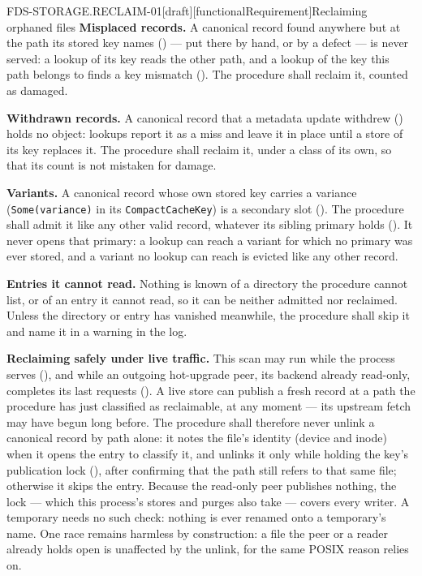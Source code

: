 \begin{requirement}{FDS-STORAGE.RECLAIM-01}[draft][functionalRequirement]{Reclaiming orphaned files}
  \textbf{Misplaced records.} A canonical record found anywhere but at the
  path its stored key names () --- put there by
  hand, or by a defect --- is never served: a lookup of its key reads the
  other path, and a lookup of the key this path belongs to finds a key
  mismatch (). The procedure shall reclaim
  it, counted as damaged.

  \textbf{Withdrawn records.} A canonical record that a metadata update
  withdrew () holds no object: lookups
  report it as a miss and leave it in place until a store of its key
  replaces it. The procedure shall reclaim it, under a class of its own, so
  that its count is not mistaken for damage.

  \textbf{Variants.} A canonical record whose own stored key carries a
  variance (\texttt{Some(variance)} in its \texttt{CompactCacheKey}) is a
  secondary slot (). The procedure shall
  admit it like any other valid record, whatever its sibling primary holds
  (). It never opens that primary: a lookup
  can reach a variant for which no primary was ever stored, and a variant no
  lookup can reach is evicted like any other record.

  \textbf{Entries it cannot read.} Nothing is known of a directory the
  procedure cannot list, or of an entry it cannot read, so it can be neither
  admitted nor reclaimed. Unless the directory or entry has vanished
  meanwhile, the procedure shall skip it and name it in a warning in the
  log.

  \textbf{Reclaiming safely under live traffic.} This scan may run while the
  process serves (), and while an outgoing
  hot-upgrade peer, its backend already read-only, completes its last requests
  (). A live store can publish a fresh record at a
  path the procedure has just classified as reclaimable, at any moment ---
  its upstream fetch may have begun long before. The procedure shall
  therefore never unlink a canonical record by path alone: it notes the
  file's identity (device and inode) when it opens the entry to classify it,
  and unlinks it only while holding the key's publication lock
  (), after confirming that the path still
  refers to that same file; otherwise it skips the entry. Because the read-only
  peer publishes nothing, the lock --- which this process's stores and purges
  also take --- covers every writer. A temporary needs no such check: nothing
  is ever renamed onto a temporary's name. One race remains harmless by
  construction: a file the peer or a reader already holds open is unaffected
  by the unlink, for the same POSIX reason 
  relies on.


\end{requirement}
